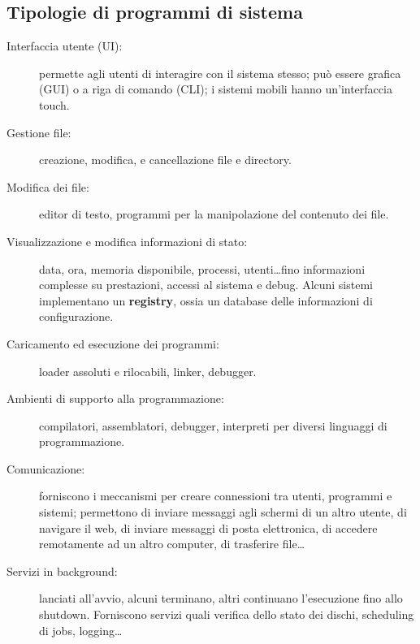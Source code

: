 \begin{description}
\subsection{Tipologie di programmi di sistema}
\begin{description}
    \item[Interfaccia utente (UI):] permette agli utenti di interagire con il sistema stesso; può essere grafica (GUI) o a riga di comando (CLI); i sistemi mobili hanno un'interfaccia touch.
    \item[Gestione file:] creazione, modifica, e cancellazione file e directory.
    \item[Modifica dei file:] editor di testo, programmi per la manipolazione del contenuto dei file.
    \item[Visualizzazione e modifica informazioni di stato:] data, ora, memoria disponibile, processi, utenti\dots fino informazioni complesse su prestazioni, accessi al sistema e debug. Alcuni sistemi implementano un \textbf{registry}, ossia un database delle informazioni di configurazione.
    \item[Caricamento ed esecuzione dei programmi:] loader assoluti e rilocabili, linker, debugger.
    \item[Ambienti di supporto alla programmazione:] compilatori, assemblatori, debugger, interpreti per diversi linguaggi di programmazione.
    \item[Comunicazione:] forniscono i meccanismi per creare connessioni tra utenti, programmi e sistemi; permettono di inviare messaggi agli schermi di un altro utente, di navigare il web, di inviare messaggi di posta elettronica, di accedere remotamente ad un altro computer, di trasferire file\dots
    \item[Servizi in background:] lanciati all'avvio, alcuni terminano, altri continuano l'esecuzione fino allo shutdown. Forniscono servizi quali verifica dello stato dei dischi, scheduling di jobs, logging\dots
\end{description}


\end{description}
